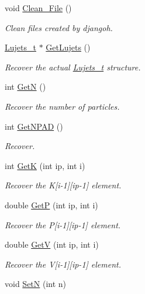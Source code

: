 \begin{DoxyCompactItemize}
void \hyperlink{class_t_djangoh_adf5acc5294013735f2475d4ce8ccf012}{Clean\+\_\+\+File} ()
\begin{DoxyCompactList}\small\item\em Clean files created by djangoh. \end{DoxyCompactList}\item 
\hyperlink{struct_lujets__t}{Lujets\+\_\+t} $\ast$ \hyperlink{class_t_djangoh_a2572e682379a304f84f21840d488fa0c}{Get\+Lujets} ()
\begin{DoxyCompactList}\small\item\em Recover the actual \hyperlink{struct_lujets__t}{Lujets\+\_\+t} structure. \end{DoxyCompactList}\item 
int \hyperlink{class_t_djangoh_a501e50bbb1ad6a75014fd7c555313b74}{GetN} ()
\begin{DoxyCompactList}\small\item\em Recover the number of particles. \end{DoxyCompactList}\item 
int \hyperlink{class_t_djangoh_afb58be11a10e8a6a4b442ea0fe4e16f5}{Get\+N\+P\+AD} ()
\begin{DoxyCompactList}\small\item\em Recover. \end{DoxyCompactList}\item 
int \hyperlink{class_t_djangoh_aaf2c94dbb8382bbd3b7ed1530a8ac878}{GetK} (int ip, int i)
\begin{DoxyCompactList}\small\item\em Recover the K\mbox{[}i-\/1\mbox{]}\mbox{[}ip-\/1\mbox{]} element. \end{DoxyCompactList}\item 
double \hyperlink{class_t_djangoh_a2bc14d05d493e604f9f7fef847c19c9b}{GetP} (int ip, int i)
\begin{DoxyCompactList}\small\item\em Recover the P\mbox{[}i-\/1\mbox{]}\mbox{[}ip-\/1\mbox{]} element. \end{DoxyCompactList}\item 
double \hyperlink{class_t_djangoh_a4993a87fef8917b9ed8a55811aa2daf6}{GetV} (int ip, int i)
\begin{DoxyCompactList}\small\item\em Recover the V\mbox{[}i-\/1\mbox{]}\mbox{[}ip-\/1\mbox{]} element. \end{DoxyCompactList}\item 
void \hyperlink{class_t_djangoh_ac15b9862e954349fd9f0911c71e0e664}{SetN} (int n)

\end{DoxyCompactItemize}
